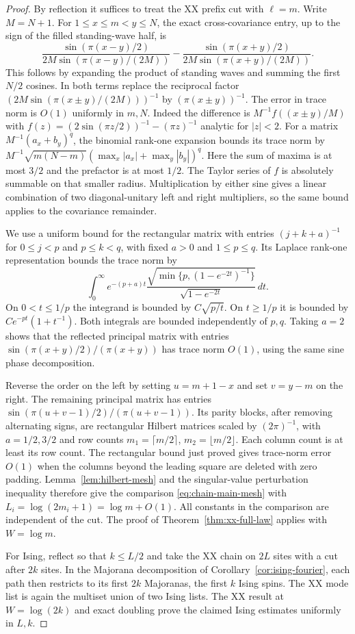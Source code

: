 \begin{proof}
By reflection it suffices to treat the XX prefix cut with $\ell=m$.
Write $M=N+1$. For $1\le x\le m<y\le N$, the exact cross-covariance
entry, up to the sign of the filled standing-wave half, is
\[
 \frac{\sin(\pi(x-y)/2)}{2M\sin(\pi(x-y)/(2M))}
 -\frac{\sin(\pi(x+y)/2)}{2M\sin(\pi(x+y)/(2M))}.
\]
This follows by expanding the product of standing waves and summing
the first $N/2$ cosines. In both terms replace the reciprocal factor
$(2M\sin(\pi(x\pm y)/(2M)))^{-1}$ by $(\pi(x\pm y))^{-1}$.
The error in trace norm is $O(1)$ uniformly in $m,N$. Indeed the
difference is $M^{-1}f((x\pm y)/M)$ with
$f(z)=(2\sin(\pi z/2))^{-1}-(\pi z)^{-1}$ analytic for $|z|<2$.
For a matrix $M^{-1}(a_x+b_y)^q$, the binomial rank-one expansion
bounds its trace norm by
$M^{-1}\sqrt{m(N-m)}(\max_x|a_x|+\max_y|b_y|)^q$.
Here the sum of maxima is at most $3/2$ and the prefactor is at most
$1/2$. The Taylor series of $f$ is absolutely summable on that
smaller radius. Multiplication by either sine gives a linear
combination of two diagonal-unitary left and right multipliers,
so the same bound applies to the covariance remainder.

We use a uniform bound for the rectangular matrix with entries
$(j+k+a)^{-1}$ for $0\le j<p$ and $p\le k<q$, with fixed $a>0$ and
$1\le p\le q$. Its Laplace rank-one representation bounds the trace
norm by
\[
 \int_0^\infty e^{-(p+a)t}
 \frac{\sqrt{\min\{p,(1-e^{-2t})^{-1}\}}}{\sqrt{1-e^{-2t}}}\,dt.
\]
On $0<t\le1/p$ the integrand is bounded by $C\sqrt{p/t}$.
On $t\ge1/p$ it is bounded by $C e^{-pt}(1+t^{-1})$. Both
integrals are bounded independently of $p,q$. Taking $a=2$ shows that
the reflected principal matrix with entries
$\sin(\pi(x+y)/2)/(\pi(x+y))$ has trace norm $O(1)$, using the same
sine phase decomposition.

Reverse the order on the left by setting $u=m+1-x$ and set $v=y-m$
on the right. The remaining principal matrix has entries
$\sin(\pi(u+v-1)/2)/(\pi(u+v-1))$. Its parity blocks, after removing
alternating signs, are rectangular Hilbert matrices scaled by
$(2\pi)^{-1}$, with $a=1/2,3/2$ and row counts
$m_1=\lceil m/2\rceil$, $m_2=\lfloor m/2\rfloor$. Each column count
is at least its row count. The rectangular bound just proved gives
trace-norm error $O(1)$ when the columns beyond the leading square
are deleted with zero padding. Lemma~\ref{lem:hilbert-mesh} and the
singular-value perturbation inequality therefore give the comparison
\eqref{eq:chain-main-mesh} with $L_i=\log(2m_i+1)=\log m+O(1)$.
All constants in the comparison are independent of the cut. The
proof of Theorem~\ref{thm:xx-full-law} applies with $W=\log m$.

For Ising, reflect so that $k\le L/2$ and take the XX chain on $2L$
sites with a cut after $2k$ sites. In the Majorana decomposition of
Corollary~\ref{cor:ising-fourier}, each path then restricts to its
first $2k$ Majoranas, the first $k$ Ising spins. The XX mode list is
again the multiset union of two Ising lists. The XX result at
$W=\log(2k)$ and exact doubling prove the claimed Ising estimates
uniformly in $L,k$.
\end{proof}

